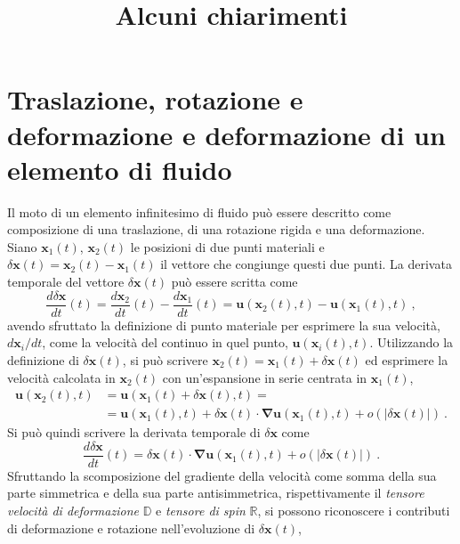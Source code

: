 \documentclass[11pt,fleqn]{article}
\title{Alcuni chiarimenti}
\begin{document}
\maketitle

\section{Traslazione, rotazione e deformazione e deformazione di un elemento di fluido}
Il moto di un elemento infinitesimo di fluido può essere descritto come composizione di una traslazione, di una rotazione rigida e una deformazione.
Siano $\bm{x}_1(t)$, $\bm{x}_2(t)$ le posizioni di due punti materiali e $\delta\bm{x}(t) = \bm{x}_2(t) - \bm{x}_1(t)$ il vettore che congiunge questi due punti.
La derivata temporale del vettore $\delta \bm{x}(t)$ può essere scritta come
\begin{equation}
 \frac{d \delta\bm{x}}{d t}(t) =
  \frac{d \bm{x}_2}{d t}(t) - \frac{d \bm{x}_1}{d t}(t) = 
  \bm{u}(\bm{x}_2(t),t) - \bm{u}(\bm{x}_1(t),t) \ , 
\end{equation}
avendo sfruttato la definizione di punto materiale per esprimere la sua velocità,
$d \bm{x}_i/dt$, come la velocità del continuo in quel punto, $\bm{u}(\bm{x}_i(t),t)$.
\newline \noindent
Utilizzando la definizione di $\delta \bm{x}(t)$, si può scrivere $\bm{x}_2(t) = \bm{x}_1(t) + \delta \bm{x}(t)$ ed esprimere la velocità calcolata in $\bm{x}_2(t)$ con un'espansione in serie centrata in $\bm{x}_1(t)$,
\begin{equation}
\begin{aligned}
    \bm{u}(\bm{x}_2(t),t) & = \bm{u}(\bm{x}_1(t)+\delta\bm{x}(t),t) = \\
    & = \bm{u}(\bm{x}_1(t),t) + \delta\bm{x}(t) \cdot \bm{\nabla} \bm{u}(\bm{x}_1(t),t) +
    o(|\delta\bm{x}(t)|) \ .
\end{aligned}
\end{equation}
Si può quindi scrivere la derivata temporale di $\delta \bm{x}$ come
\begin{equation}
 \frac{d \delta \bm{x}}{d t}(t) = \delta \bm{x}(t) \cdot \bm{\nabla}\bm{u}(\bm{x}_1(t),t) + o(|\delta\bm{x}(t)|) \ .
\end{equation}
Sfruttando la scomposizione del gradiente della velocità come somma della sua parte simmetrica e della sua parte antisimmetrica, rispettivamente il \textit{tensore velocità di deformazione} $\mathbb{D}$ e \textit{tensore di spin} $\mathbb{R}$, si possono riconoscere i contributi di deformazione e rotazione nell'evoluzione di $\delta \bm{x}(t)$,
\end{document}
